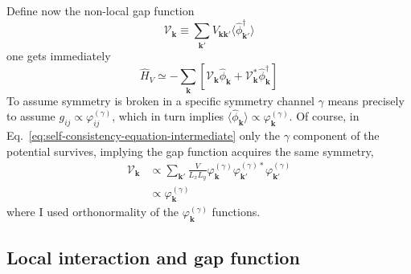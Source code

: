 Define now the non-local gap function
\begin{equation}\label{eq:self-consistency-equation-intermediate}
	\mathcal{V}_\mathbf{k} \equiv \sum_{\mathbf{k}'}
	V_{\mathbf{k}\mathbf{k}'}
	\langle
	\hat \phi_{\mathbf{k}'}^\dagger
	\rangle
\end{equation}
one gets immediately
\begin{equation}\label{eq:extended-hubbard-nonlocal-interaction-mean-field-reciprocal}
	\hat H_V \simeq -\sum_\mathbf{k} \left[
	\mathcal{V}_\mathbf{k} \hat \phi_\mathbf{k} + \mathcal{V}_\mathbf{k}^* \hat \phi_\mathbf{k}^\dagger
	\right]	
\end{equation}
To assume symmetry is broken in a specific symmetry channel $\gamma$ means precisely to assume $g_{ij} \propto \varphi_{ij}^{(\gamma)}$, which in turn implies $\langle \hat \phi_\mathbf{k} \rangle \propto \varphi_\mathbf{k}^{(\gamma)}$. Of course, in Eq.~\eqref{eq:self-consistency-equation-intermediate} only the $\gamma$ component of the potential survives, implying the gap function acquires the same symmetry,
\[
\begin{aligned}
	\mathcal{V}_\mathbf{k} &\propto \sum_{\mathbf{k}'}
	\frac{V}{L_xL_y} \varphi_\mathbf{k}^{(\gamma)} \varphi_{\mathbf{k}'}^{(\gamma)*}
	\varphi_{\mathbf{k}'}^{(\gamma)} \\
	&\propto \varphi_\mathbf{k}^{(\gamma)}
\end{aligned}
\]
where I used orthonormality of the $\varphi_\mathbf{k}^{(\gamma)}$ functions.

\subsection{Local interaction and gap function}


